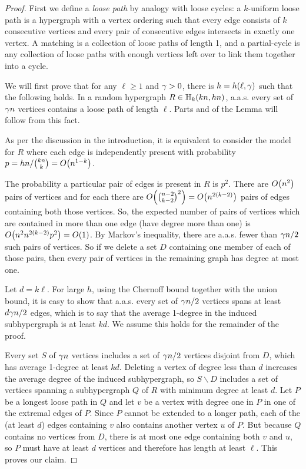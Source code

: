 \documentclass[11pt,english]{article}
\theoremstyle{plain}
\theoremstyle{definition}
\theoremstyle{definition}
\theoremstyle{plain}
\theoremstyle{plain}
\theoremstyle{plain}
\theoremstyle{plain}
\theoremstyle{remark}
\theoremstyle{remark}
\let\originalleft\left
\let\originalright\right
\renewcommand{\left}{\mathopen{}\mathclose\bgroup\originalleft}
\renewcommand{\right}{\aftergroup\egroup\originalright}
\begin{document}
\begin{proof}
First we define a \emph{loose path} by analogy with loose cycles:
a $k$-uniform loose path is a hypergraph with a vertex ordering such
that every edge consists of $k$ consecutive vertices and every pair
of consecutive edges intersects in exactly one vertex. A matching
is a collection of loose paths of length 1, and a partial-cycle is any
collection of loose paths with enough vertices left over to link them
together into a cycle.

We will first prove that for any $\ell\ge1$ and $\gamma>0$, there
is $h=h\left(\ell,\patheps\right)$ such that the following holds. In a
random hypergraph $R\in\HH_{k}\left(kn,hn\right)$,
a.a.s. every set of $\gamma n$ vertices contains a loose path of length
$\ell$. Parts  and  of the Lemma will follow from this fact.

As per the discussion in the introduction, it is equivalent to consider
the model for $R$ where each edge is independently present with probability
$p=hn/{kn \choose k}=O\left(n^{1-k}\right)$.

The probability a particular pair of edges is present in $R$ is $p^2$. There are $O\left(n^2\right)$ pairs of vertices and for each there are $O\left({n-2\choose k-2}^2\right)=
O\left(n^{2\left(k-2\right)}\right)$ pairs of edges containing both those vertices. So, the expected number of pairs of vertices
which are contained in more than one edge (have degree more than one)
is $O\left(n^2n^{2\left(k-2\right)}p^2\right)=O\left(1\right)$. By Markov's inequality, there are a.a.s. fewer
than $\gamma n/2$ such pairs of vertices. So if we delete a
set $D$ containing one member of each of those pairs, then every pair of vertices in the remaining graph has
degree at most one.

Let $d=k\ell$. For
large $h$, using the Chernoff bound together with the union
bound, it is easy to show that a.a.s. every set of $\gamma n/2$ vertices spans at least $d\gamma n/2$
edges, which is to say that the average 1-degree in the induced subhypergraph
is at least $kd$. We assume this holds for the remainder of the proof.

Every set $S$ of $\gamma n$ vertices includes a set of $\gamma n/2$
vertices disjoint from $D$, which has average 1-degree at least $kd$.
Deleting a vertex of degree less than $d$ increases the average degree
of the induced subhypergraph, so $S\backslash D$ includes a set of
vertices spanning a subhypergraph $Q$ of $R$ with minimum degree
at least $d$. Let $P$ be a longest loose path in $Q$ and let $v$
be a vertex with degree one in $P$ in one of the extremal edges of $P$. Since $P$ cannot
be extended to a longer path, each of the (at least $d$) edges containing
$v$ also contains another vertex $u$ of $P$. But because $Q$ contains
no vertices from $D$, there is at most
one edge containing both $v$ and $u$, so $P$ must have at least
$d$ vertices and therefore has length at least $\ell$. This proves
our claim.


\end{proof}
\end{document}
